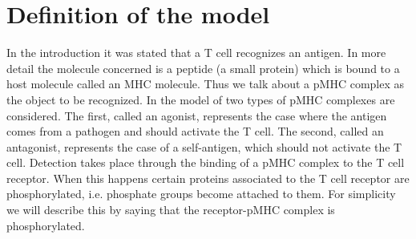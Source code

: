 \documentclass{article}
\begin{document}
\section{Definition of the model}\label{def} 

In the introduction it was stated that a T cell recognizes an antigen. In 
more detail the molecule concerned is a peptide (a small protein) which is 
bound to a host molecule called an MHC molecule. Thus we talk about a pMHC 
complex as the object to be recognized. In the model of \cite{francois13} two 
types of pMHC complexes are considered. The first, called an agonist, 
represents the case where the antigen comes from a pathogen and should 
activate the T cell. The second, called an antagonist, represents the case of 
a self-antigen, which should not activate the T cell. Detection takes place 
through the binding of a pMHC complex to the T cell receptor.
When this happens certain proteins associated to the T cell receptor are 
phosphorylated, i.e. phosphate groups become attached to them. For simplicity we
will describe this by saying that the receptor-pMHC complex is phosphorylated.
\end{document}
